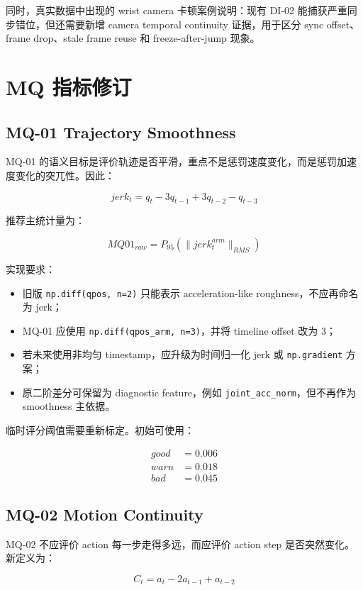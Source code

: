\documentclass[UTF8,zihao=-4,oneside,openany]{ctexrep}
\newcommand{\Code}[1]{\texttt{#1}}
\begin{document}
同时，真实数据中出现的 wrist camera 卡顿案例说明：现有 DI-02 能捕获严重同步错位，但还需要新增 camera temporal continuity 证据，用于区分 sync offset、frame drop、stale frame reuse 和 freeze-after-jump 现象。

\section{MQ 指标修订}

\subsection{MQ-01 Trajectory Smoothness}

MQ-01 的语义目标是评价轨迹是否平滑，重点不是惩罚速度变化，而是惩罚加速度变化的突兀性。因此：

\[
jerk_t = q_t - 3q_{t-1} + 3q_{t-2} - q_{t-3}
\]

推荐主统计量为：

\[
MQ01_{raw}=P_{95}(\|jerk_t^{arm}\|_{RMS})
\]

实现要求：

\begin{itemize}
\item 旧版 \Code{np.diff(qpos, n=2)} 只能表示 acceleration-like roughness，不应再命名为 jerk；
\item MQ-01 应使用 \Code{np.diff(qpos\_arm, n=3)}，并将 timeline offset 改为 3；
\item 若未来使用非均匀 timestamp，应升级为时间归一化 jerk 或 \Code{np.gradient} 方案；
\item 原二阶差分可保留为 diagnostic feature，例如 \Code{joint\_acc\_norm}，但不再作为 smoothness 主依据。
\end{itemize}

临时评分阈值需要重新标定。初始可使用：

\[
\begin{aligned}
good &= 0.006\\
warn &= 0.018\\
bad &= 0.045
\end{aligned}
\]

\subsection{MQ-02 Motion Continuity}

MQ-02 不应评价 action 每一步走得多远，而应评价 action step 是否突然变化。新定义为：

\[
C_t=a_t-2a_{t-1}+a_{t-2}
\]
\end{document}
